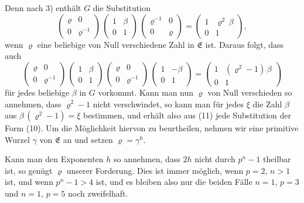 \documentclass[12pt,a4paper]{article}
\begin{document}
Denn nach 3) enthält $G$ die Substitution
\[
\begin{pmatrix}\varrho&0\\0&\varrho^{-1}\end{pmatrix}\,
\begin{pmatrix}1&\beta\\0&1\end{pmatrix}\,
\begin{pmatrix}\varrho^{-1}&0\\0&\varrho\end{pmatrix}
= \begin{pmatrix}1&\varrho^{2}\,\beta\\0&1\end{pmatrix},
\]
wenn $\varrho$ eine beliebige von Null verschiedene Zahl in $\mathfrak{E}$ ist. Daraus folgt, dass auch
\[
\begin{pmatrix}\varrho&0\\0&\varrho^{-1}\end{pmatrix}\,
\begin{pmatrix}1&\beta\\0&1\end{pmatrix}\,
\begin{pmatrix}\varrho&0\\0&\varrho^{-1}\end{pmatrix}\,
\begin{pmatrix}1&-\beta\\0&1\end{pmatrix}
= \begin{pmatrix}1&(\varrho^{2} - 1)\,\beta\\0&1\end{pmatrix}
\]
für jedes beliebige $\beta$ in $G$ vorkommt. Kann man nun $\varrho$ von Null verschieden so annehmen, dass $\varrho^{2} - 1$ nicht verschwindet, so kann man für jedes $\xi$ die Zahl $\beta$ aus $\beta\,(\varrho^{2} - 1) = \xi$ bestimmen, und erhält also aus (11) jede Substitution der Form (10). Um die Möglichkeit hiervon zu beurtheilen, nehmen wir eine primitive Wurzel $\gamma$ von $\mathfrak{E}$ an und setzen $\varrho = \gamma^{h}$.

Kann man den Exponenten $h$ so annehmen, dass $2h$ nicht durch $p^{n} - 1$ theilbar ist, so genügt $\varrho$ unserer Forderung. Dies ist immer möglich, wenn $p = 2$, $n > 1$ ist, und wenn $p^{n} - 1 > 4$ ist, und es bleiben also nur die beiden Fälle $n = 1$, $p = 3$ und $n = 1$, $p = 5$ noch zweifelhaft.

\newpage
{}
\end{document}
